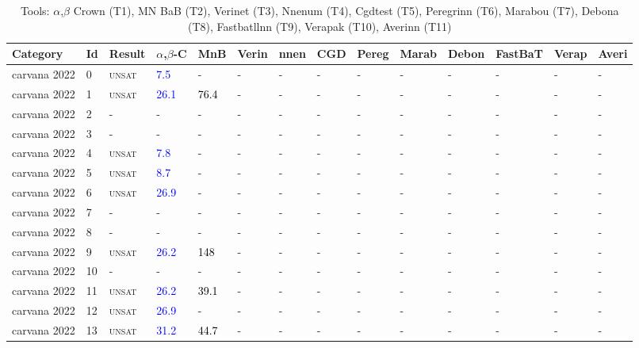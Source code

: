 

\begin{center}
{\setlength{\tabcolsep}{1pt}
\scriptsize
\begin{longtable}{@{}llllllllllllll@{}}
\caption{\footnotesize Tools: $\alpha$,$\beta$ Crown (T1), MN BaB (T2), Verinet (T3), Nnenum (T4), Cgdtest (T5), Peregrinn (T6), Marabou (T7), Debona (T8), Fastbatllnn (T9), Verapak (T10), Averinn (T11)} \label{tab:all_results} \\
\toprule
\textbf{Category} & \textbf{Id} & \textbf{Result} & \textbf{$\alpha$,$\beta$-C} & \textbf{MnB} & \textbf{Verin} & \textbf{nnen} & \textbf{CGD} & \textbf{Pereg} & \textbf{Marab} & \textbf{Debon} & \textbf{FastBaT} & \textbf{Verap} & \textbf{Averi} \\
\midrule
\endhead
carvana 2022 & 0 & \textsc{unsat} & \textcolor{blue}{7.5} & - & - & - & - & - & - & - & - & - & - \\
carvana 2022 & 1 & \textsc{unsat} & \textcolor{blue}{26.1} & \textcolor{black}{76.4} & - & - & - & - & - & - & - & - & - \\
carvana 2022 & 2 & - & - & - & - & - & - & - & - & - & - & - & - \\
carvana 2022 & 3 & - & - & - & - & - & - & - & - & - & - & - & - \\
carvana 2022 & 4 & \textsc{unsat} & \textcolor{blue}{7.8} & - & - & - & - & - & - & - & - & - & - \\
carvana 2022 & 5 & \textsc{unsat} & \textcolor{blue}{8.7} & - & - & - & - & - & - & - & - & - & - \\
carvana 2022 & 6 & \textsc{unsat} & \textcolor{blue}{26.9} & - & - & - & - & - & - & - & - & - & - \\
carvana 2022 & 7 & - & - & - & - & - & - & - & - & - & - & - & - \\
carvana 2022 & 8 & - & - & - & - & - & - & - & - & - & - & - & - \\
carvana 2022 & 9 & \textsc{unsat} & \textcolor{blue}{26.2} & \textcolor{black}{148} & - & - & - & - & - & - & - & - & - \\
carvana 2022 & 10 & - & - & - & - & - & - & - & - & - & - & - & - \\
carvana 2022 & 11 & \textsc{unsat} & \textcolor{blue}{26.2} & \textcolor{black}{39.1} & - & - & - & - & - & - & - & - & - \\
carvana 2022 & 12 & \textsc{unsat} & \textcolor{blue}{26.9} & - & - & - & - & - & - & - & - & - & - \\
carvana 2022 & 13 & \textsc{unsat} & \textcolor{blue}{31.2} & \textcolor{black}{44.7} & - & - & - & - & - & - & - & - & - \\

\end{longtable}}
\end{center}
